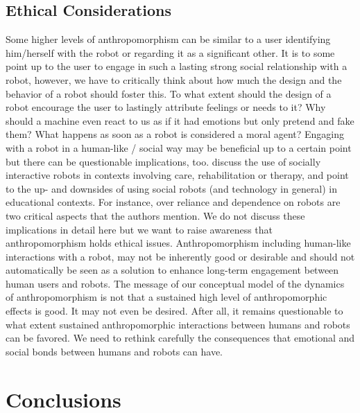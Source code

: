 \documentclass{frontiersSCNS} %
\begin{document}
\subsection{Ethical Considerations}

Some higher levels of anthropomorphism can be similar to a user identifying him/herself with the robot or regarding it as a significant other. It is to some point up to the user to engage in such a lasting strong social relationship with a robot, however, we have to critically think about how much the design and the behavior of a robot should foster this.
To what extent should the design of a robot encourage the user to lastingly attribute feelings or needs to it? Why should a machine even react to us as if it had emotions but only pretend and fake them? What happens as soon as a robot is considered a moral agent? \citep{sullins_when_2006}
Engaging with a robot in a human-like / social way may be beneficial up to a certain point but there can be questionable implications, too. \cite{robins_robots_2005} discuss the use of socially interactive robots in contexts involving care, rehabilitation or therapy, and \cite{tanaka_care-receiving_2010} point to the up- and downsides of using social robots (and technology in general) in educational contexts. For instance, over reliance and dependence on robots are two critical aspects that the authors mention. 
We do not discuss these implications in detail here but we want to raise awareness that anthropomorphism holds ethical issues. Anthropomorphism including human-like interactions with a robot, may not be inherently good or desirable and should not automatically be seen as a solution to enhance long-term engagement between human users and robots. The message of our conceptual model of the dynamics of anthropomorphism is not that a sustained high level of anthropomorphic effects is good. It may not even be desired.
After all, it remains questionable to what extent sustained anthropomorphic interactions between humans and robots can be favored. We need to rethink carefully the consequences that emotional and social bonds between humans and robots can have. 


%
%
%
%
%
%

\section{Conclusions}
\label{sec:conclusions}
\end{document}
